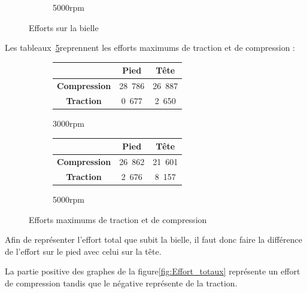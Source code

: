 \documentclass{article}
\begin{document}
\begin{figure}[h]
\begin{subfigure}[h]{0.45\textwidth}
                \caption{\unit{5000}{rpm}}
                \label{fig:forces_5000rpm}
    \end{subfigure}
    \caption{Efforts sur la bielle}
    \label{fig:EffortBielle}
\end{figure}


Les tableaux~\ref{fig:EffortMaxtrac}reprennent les efforts maximums de traction et de compression :

\begin{figure}[h]
\centering
    \begin{subfigure}[h]{0.45\textwidth}
    		\begin{tabular}{|c|c|c|}
		\hline 
  		& \textbf{Pied} & \textbf{Tête} \\ 
		\hline 
		\textbf{Compression} & \unit{28.786}{ \kilo\newton} & \unit{26.887}{\kilo\newton} \\ 
		\hline 
		\textbf{Traction} & \unit{0.677}{ \kilo\newton} & \unit{2.650}{ \kilo\newton} \\ 
		\hline 
		\end{tabular}
		\caption{\unit{3000}{rpm}}
		\label{fig:tab_forces_3000rpm}
    \end{subfigure}
    \begin{subfigure}[h]{0.45\textwidth}
        	\begin{tabular}{|c|c|c|}
		\hline 
  		& \textbf{Pied} & \textbf{Tête} \\ 
		\hline 
		\textbf{Compression} & \unit{26.862}{ \kilo\newton} & \unit{21.601}{ \kilo\newton}\\ 
		\hline 
		\textbf{Traction} & \unit{2.676}{ \kilo\newton} & \unit{8.157}{\kilo\newton} \\ 
		\hline 
		\end{tabular} 	
		\caption{\unit{5000}{rpm}}
		\label{fig:tab_forces_5000rpm}	
    \end{subfigure}
    \caption{Efforts maximums de traction et de compression}
    \label{fig:EffortMaxtrac}
\end{figure}

Afin de représenter l'effort total que subit la bielle, il faut donc faire la différence de l'effort sur le pied avec celui sur la tête.

La partie positive des graphes de la figure\ref{fig:Effort_totaux} représente un effort de compression tandis que le négative représente de la traction.
\end{document}
